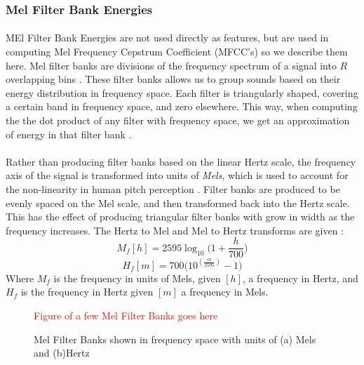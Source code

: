 \documentclass[12pt,letterpaper]{article}
\begin{document}

\subsubsection{Mel Filter Bank Energies}

\paragraph*{}MEl Filter Bank Energies are not used directly as features, but are used in computing Mel Frequency Cepstrum Coefficient (MFCC's) so we describe them here. Mel filter banks are divisions of the frequency spectrum of a signal into $R$ overlapping bins \cite{Sahidullah,Serizel}. These filter banks allows us to group sounds based on their energy distribution in frequency space. Each filter is triangularly shaped, covering a certain band in frequency space, and zero elsewhere. This way, when computing the the dot product of any filter with frequency space, we get an approximation of energy in that filter bank \cite{Sahidullah,Serizel}. 

\paragraph*{}Rather than producing filter banks based on the linear Hertz scale, the frequency axis of the signal is transformed into units of \textit{Mels}, which is used to account for the non-linearity in human pitch perception \cite{Serizel,Khan}. Filter banks are produced to be evenly spaced on the Mel scale, and then transformed back into the Hertz scale. This has the effect of producing triangular filter banks with grow in width as the frequency increases. The Hertz to Mel and Mel to Hertz transforms are given \cite{Serizel,Kahn}:
\begin{equation}
\label{eqn-HztoMel}
M_f[h] = 2595 \log_{10}\big(1+ \frac{h}{700}\big)
\end{equation}
\begin{equation}
\label{eqn-MeltoHz}
H_f[m] = 700 \big(10^{(\frac{m}{2595})}-1\big)
\end{equation}
Where $M_f$ is the frequency in units of Mels, given $[h]$, a frequency in Hertz, and $H_f$ is the frequency in Hertz given $[m]$ a frequency in Mels.


\begin{figure}[H]
\begin{center}
\textcolor{red}{Figure of a few Mel Filter Banks goes here}
\end{center}
\caption{Mel Filter Banks shown in frequency space with units of (a) Mels and (b)Hertz}
\label{fig-MelFilterBanks}
\end{figure}
\end{document}
